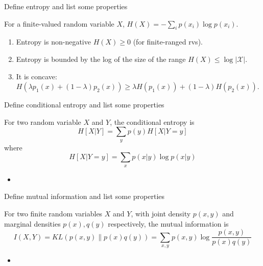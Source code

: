 \documentclass[avery5388,grid,frame]{flashcards}
\begin{document}


\begin{flashcard}
    {Define entropy and list some properties}
    \begin{definition}
        For a finite-valued random variable $X$, $H(X) = - \sum_i p(x_i) \log p(x_i)$.
    \end{definition}

    \begin{properties}
        \begin{enumerate}
            \item Entropy is non-negative $H(X) \geq 0$ (for finite-ranged rvs).
            \item Entropy is bounded by the log of the size of the range $H(X) \leq \log |\mathcal X|$.
            \item It is concave: $H(\lambda p_1(x) + (1-\lambda) p_2(x)) \geq \lambda H(p_1(x)) + (1- \lambda) H(p_2(x))$.
        \end{enumerate}
    \end{properties}
\end{flashcard}


\begin{flashcard}
    {Define conditional entropy and list some properties}
    \begin{definition}
        For two random variable $X$ and $Y$, the conditional entropy is
        $$H[X|Y] = \sum_y p(y) H[X | Y = y]$$
        where
        $$H[X | Y = y] = \sum_x p(x | y) \log p(x | y)$$
    \end{definition}

    \begin{properties}
        \begin{itemize}
            \item
        \end{itemize}
    \end{properties}
\end{flashcard}


\begin{flashcard}
    {Define mutual information and list some properties}
    \begin{definition}
        For two finite random variables $X$ and $Y$, with joint density $p(x,y)$ and marginal densities $p(x),q(y)$ respectively, the mutual information is
        $$I(X,Y) = KL(p(x,y) \| p(x)q(y)) = \sum_{x,y} p(x,y) \log \frac{p(x,y)}{p(x)q(y)}$$
    \end{definition}

    \begin{properties}
        \begin{itemize}
            \item
        \end{itemize}
    \end{properties}
\end{flashcard}
\end{document}
